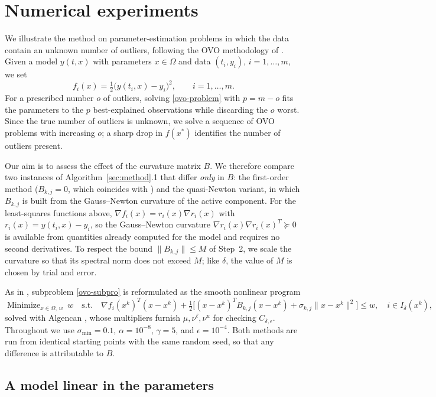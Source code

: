 \documentclass[11pt]{article}
\newcommand{\minimize}{\mathop{\text{Minimize}}}
\begin{document}
\section{Numerical experiments} \label{sec:numerical}

We illustrate the method on parameter-estimation problems in which the data
contain an unknown number of outliers, following the OVO methodology of
\cite{alvarezovo}. Given a model $y(t,x)$ with parameters $x\in\Omega$ and data
$(t_i,y_i)$, $i=1,\dots,m$, we set
\[
f_i(x)=\tfrac12\big(y(t_i,x)-y_i\big)^2,\qquad i=1,\dots,m.
\]
For a prescribed number $o$ of outliers, solving \eqref{ovo-problem} with
$p=m-o$ fits the parameters to the $p$ best-explained observations while
discarding the $o$ worst. Since the true number of outliers is unknown, we
solve a sequence of OVO problems with increasing $o$; a sharp drop in $f(x^*)$
identifies the number of outliers present.

Our aim is to assess the effect of the curvature matrix $B$. We therefore
compare two instances of Algorithm~\ref{sec:method}.1 that differ \emph{only}
in $B$: the first-order method ($B_{k,j}=0$, which coincides with
\cite{alvarezovo}) and the quasi-Newton variant, in which $B_{k,j}$ is built
from the Gauss--Newton curvature of the active component. For the least-squares
functions above, $\nabla f_i(x)=r_i(x)\nabla r_i(x)$ with
$r_i(x)=y(t_i,x)-y_i$, so the Gauss--Newton curvature
$\nabla r_i(x)\nabla r_i(x)^T\succeq0$ is available from quantities already
computed for the model and requires no second derivatives. To respect the
bound $\|B_{k,j}\|\le M$ of Step~2, we scale the curvature so that its spectral
norm does not exceed $M$; like $\delta$, the value of $M$ is chosen by trial
and error.

As in \cite{alvarezovo}, subproblem \eqref{ovo-subpro} is reformulated as the
smooth nonlinear program
\[
\minimize_{x\in\Omega,\,w}\ w \quad\text{s.t.}\quad
\nabla f_i(x^k)^T(x-x^k)
+\tfrac12\big[(x-x^k)^TB_{k,j}(x-x^k)+\sigma_{k,j}\|x-x^k\|^2\big]\le w,
\quad i\in I_\delta(x^k),
\]
solved with Algencan \cite{bmbook,bmcomper}, whose multipliers furnish
$\mu,\nu^\ell,\nu^u$ for checking $C_{\delta,\epsilon}$. Throughout we use
$\sigma_{\min}=0.1$, $\alpha=10^{-8}$, $\gamma=5$, and $\epsilon=10^{-4}$. Both
methods are run from identical starting points with the same random seed, so
that any difference is attributable to $B$.

\subsection{A model linear in the parameters} \label{subsec:poly}
\end{document}
